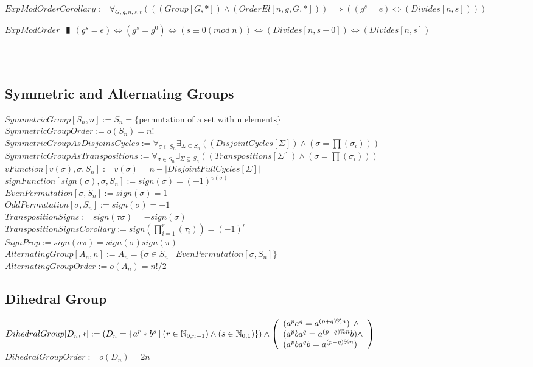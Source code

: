 \documentclass{book}
\newcommand{\abr}{:=}
\newcommand{\pipe}{$\phantom{(}\vrectangleblack\phantom{)}$}
\newcommand{\st}{\mathbin{|}}
\begin{document}
$ExpModOrderCorollary \abr \forall_{G, g, n, s, t}(((Group[G, *]) \land (OrderEl[n, g, G, *])) \implies ((g^s = e) \iff (Divides[n, s])))$
\begin{enumerate}
  \lit $ExpModOrder$ \pipe $(g^s = e) \iff (g^s = g^0) \iff (s \equiv 0 (mod \phantom{.} n)) \iff (Divides[n, s - 0]) \iff (Divides[n, s])$
\end{enumerate} \vspace{.75mm} \hrule \vspace{.75mm} \ \\ 


\subsection{Symmetric and Alternating Groups}
$SymmetricGroup[S_n, n] \abr S_n = \{\text{permutation of a set with n elements}\}$ \\
$SymmetricGroupOrder \abr o(S_n) = n!$ \\
$SymmetricGroupAsDisjoinsCycles \abr \forall_{\sigma \in S_n} \exists_{\Sigma \subseteq S_n}((DisjointCycles[\Sigma]) \land (\sigma = \prod(\sigma_i)))$ \\
$SymmetricGroupAsTranspositions \abr \forall_{\sigma \in S_n} \exists_{\Sigma \subseteq S_n}((Transpositions[\Sigma]) \land (\sigma = \prod(\sigma_i)))$ \\

$vFunction[v(\sigma), \sigma, S_n] \abr v(\sigma) = n - |DisjointFullCycles[\Sigma]|$ \\
$signFunction[sign(\sigma), \sigma, S_n] \abr sign(\sigma) = (-1)^{v(\sigma)}$ \\
$EvenPermutation[\sigma, S_n] \abr sign(\sigma) = 1$ \\
$OddPermutation[\sigma, S_n] \abr sign(\sigma) = -1$ \\

$TranspositionSigns \abr sign(\tau \sigma) = -sign(\sigma)$ \\
$TranspositionSignsCorollary \abr sign(\prod_{i = 1}^{r}(\tau_i)) = (-1)^r$ \\
$SignProp \abr sign(\sigma \pi) = sign(\sigma) sign(\pi)$ \\

$AlternatingGroup[A_n, n] \abr A_n = \{\sigma \in S_n \st EvenPermutation[\sigma, S_n]\}$ \\
$AlternatingGroupOrder \abr o(A_n) = n!/2$ \\

\subsection{Dihedral Group}
$DihedralGroup[D_n, *] \abr (D_n = \{a^r * b^s \st (r \in \mathbb{N}_{0, n - 1}) \land (s \in \mathbb{N}_{0, 1})\}) \land \left(\begin{array}{ll}
  (a^p a^q = a^{(p + q) \% n}) \hfill \land \hfill \\
  (a^p b a^q = a^{(p - q) \% n} b) \hfill \land \hfill \\
  (a^p b a^q b = a^{(p - q) \% n})
\end{array}\right)$ \\
$DihedralGroupOrder \abr o(D_n) = 2 n$ \\
\end{document}
